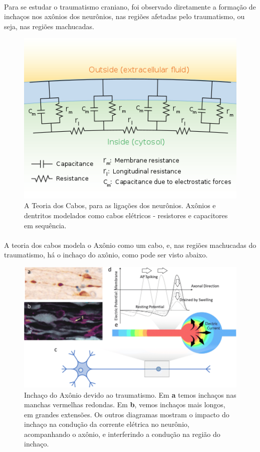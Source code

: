 \documentclass{article}
\begin{document}
	\paragraph{}
	Para se estudar o traumatismo craniano, foi observado diretamente a formação de inchaços nos axônios dos neurônios, nas regiões afetadas pelo traumatismo, ou seja, nas regiões machucadas.
	\begin{figure}[h]
		\centering
		\includegraphics[scale=0.5]{Cable-Theory}
		\caption{A Teoria dos Cabos, para as ligações dos neurônios. Axônios e dentritos modelados como cabos elétricos - resistores e capacitores em sequência.}
		\label{Figura-1}
	\end{figure}
	
	\paragraph{}
	A teoria dos cabos modela o Axônio como um cabo, e, nas regiões machucadas do traumatismo, há o inchaço do axônio, como pode ser visto abaixo.
	\begin{figure}[h]
		\centering
		\includegraphics[scale=0.4]{Axonal-Swelling}
		\caption{Inchaço do Axônio devido ao traumatismo. Em \textbf{a} temos inchaços nas manchas vermelhas redondas. Em \textbf{b}, vemos inchaços mais longos, em grandes extensões. Os outros diagramas mostram o impacto do inchaço na condução da corrente elétrica no neurônio, acompanhando o axônio, e interferindo a condução na região do inchaço.}
	\end{figure}
	
\end{document}
